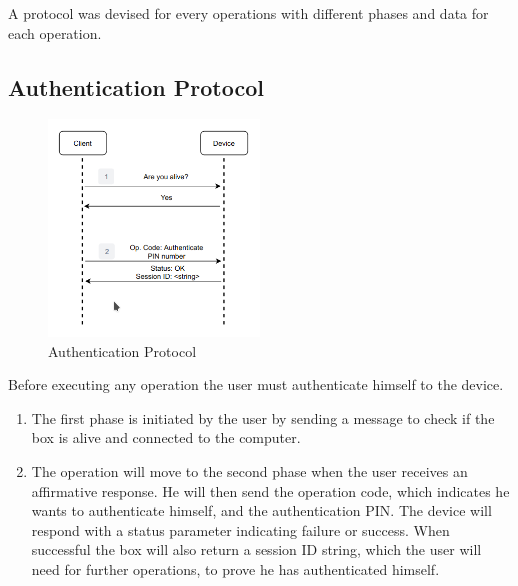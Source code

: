 A protocol was devised for every operations with different phases and data for each operation.

\subsection{Authentication Protocol} \label{chap:sol:protocol:auth}

\begin{figure}[h]
    \centering
    \includegraphics[width=0.5\textwidth]{./Images/authentication.png}
    \caption{Authentication Protocol}
    \label{fig:protocol:authentication}
\end{figure}

Before executing any operation the user must authenticate himself to the device.
\begin{enumerate}
    \item The first phase is initiated by the user by sending a message to check if the box is alive and connected to the computer.
    \item The operation will move to the second phase when the user receives an affirmative response. He will then send the operation code, which indicates he wants to authenticate himself, and the authentication PIN. The device will respond with a status parameter indicating failure or success. When successful the box will also return a session ID string, which the user will need for further operations, to prove he has authenticated himself.
\end{enumerate}


